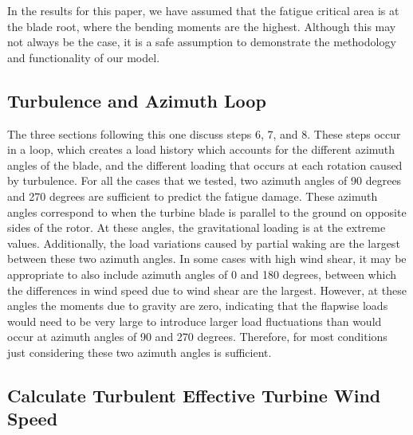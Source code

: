\documentclass[11pt,letterpaper]{article}
\begin{document}
In the results for this paper, we have assumed that the fatigue critical area is at the blade root, where the bending moments are the highest. Although this may not always be the case, it is a safe assumption to demonstrate the methodology and functionality of our model.

\subsection{Turbulence and Azimuth Loop}

The three sections following this one discuss steps 6, 7, and 8. These steps occur in a loop, which creates a load history which accounts for the different azimuth angles of the blade, and the different loading that occurs at each rotation caused by turbulence. 
For all the cases that we tested, two azimuth angles of 90 degrees and 270 degrees are sufficient to predict the fatigue damage. These azimuth angles correspond to when the turbine blade is parallel to the ground on opposite sides of the rotor. At these angles, the gravitational loading is at the extreme values. Additionally, the load variations caused by partial waking are the largest between these two azimuth angles. In some cases with high wind shear, it may be appropriate to also include azimuth angles of 0 and 180 degrees, between which the differences in wind speed due to wind shear are the largest. However, at these angles the moments due to gravity are zero, indicating that the flapwise loads would need to be very large to introduce larger load fluctuations than would occur at azimuth angles of 90 and 270 degrees. Therefore, for most conditions just considering these two azimuth angles is sufficient. %

\subsection{Calculate Turbulent Effective Turbine Wind Speed}
\end{document}
